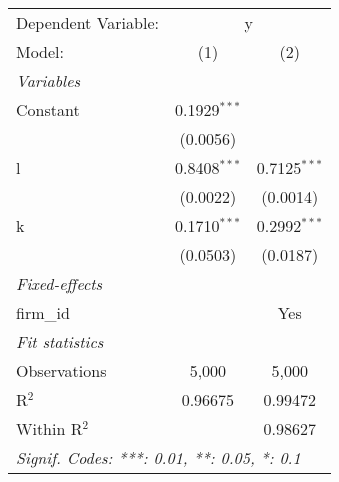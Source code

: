 \begingroup
\centering
\begin{tabular}{lcc}
   \tabularnewline \midrule \midrule
   Dependent Variable: & \multicolumn{2}{c}{y}\\
   Model:       & (1)            & (2)\\  
   \midrule
   \emph{Variables}\\
   Constant     & 0.1929$^{***}$ &   \\   
                & (0.0056)       &   \\   
   l            & 0.8408$^{***}$ & 0.7125$^{***}$\\   
                & (0.0022)       & (0.0014)\\   
   k            & 0.1710$^{***}$ & 0.2992$^{***}$\\   
                & (0.0503)       & (0.0187)\\   
   \midrule
   \emph{Fixed-effects}\\
   firm\_id     &                & Yes\\  
   \midrule
   \emph{Fit statistics}\\
   Observations & 5,000          & 5,000\\  
   R$^2$        & 0.96675        & 0.99472\\  
   Within R$^2$ &                & 0.98627\\  
   \midrule \midrule
   \multicolumn{3}{l}{\emph{Signif. Codes: ***: 0.01, **: 0.05, *: 0.1}}\\
\end{tabular}
\par\endgroup
